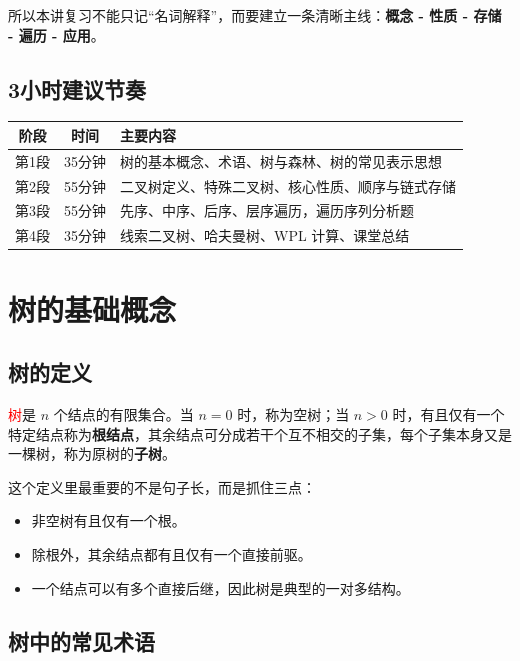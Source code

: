 \documentclass{../../note}
\begin{document}
所以本讲复习不能只记“名词解释”，而要建立一条清晰主线：\textbf{概念 - 性质 - 存储 - 遍历 - 应用}。

\subsection{3小时建议节奏}

\begin{center}
\begin{tabular}{|c|c|p{9cm}|}
\hline
阶段 & 时间 & 主要内容 \\
\hline
第1段 & 35分钟 & 树的基本概念、术语、树与森林、树的常见表示思想 \\
\hline
第2段 & 55分钟 & 二叉树定义、特殊二叉树、核心性质、顺序与链式存储 \\
\hline
第3段 & 55分钟 & 先序、中序、后序、层序遍历，遍历序列分析题 \\
\hline
第4段 & 35分钟 & 线索二叉树、哈夫曼树、WPL 计算、课堂总结 \\
\hline
\end{tabular}
\end{center}

\section{树的基础概念}

\subsection{树的定义}

\textcolor{red}{树}是 $n$ 个结点的有限集合。当 $n=0$ 时，称为空树；当 $n>0$ 时，有且仅有一个特定结点称为\textbf{根结点}，其余结点可分成若干个互不相交的子集，每个子集本身又是一棵树，称为原树的\textbf{子树}。

这个定义里最重要的不是句子长，而是抓住三点：

\begin{itemize}
  \item 非空树有且仅有一个根。
  \item 除根外，其余结点都有且仅有一个直接前驱。
  \item 一个结点可以有多个直接后继，因此树是典型的一对多结构。
\end{itemize}

\subsection{树中的常见术语}
\end{document}
